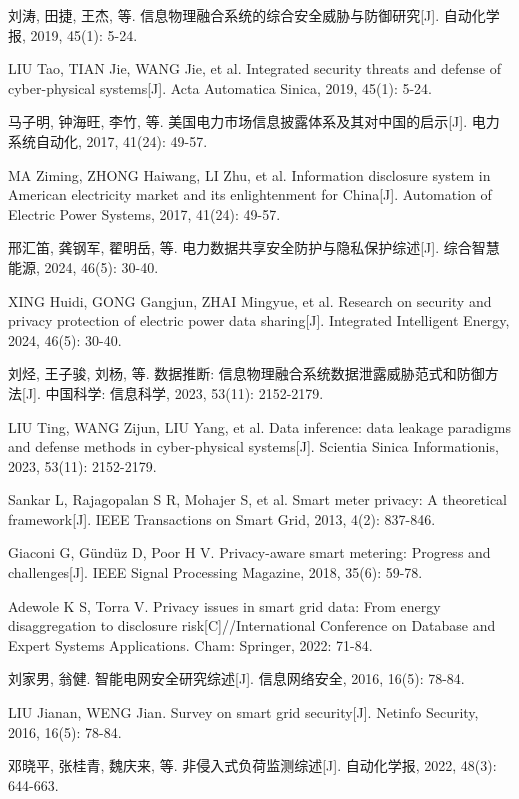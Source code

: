 刘涛, 田捷, 王杰, 等. 信息物理融合系统的综合安全威胁与防御研究[J]. 自动化学报, 2019, 45(1): 5-24.

LIU Tao, TIAN Jie, WANG Jie, et al. Integrated security threats and defense of cyber-physical systems[J]. Acta Automatica Sinica, 2019, 45(1): 5-24.

马子明, 钟海旺, 李竹, 等. 美国电力市场信息披露体系及其对中国的启示[J]. 电力系统自动化, 2017, 41(24): 49-57.

MA Ziming, ZHONG Haiwang, LI Zhu, et al. Information disclosure system in American electricity market and its enlightenment for China[J]. Automation of Electric Power Systems, 2017, 41(24): 49-57.

邢汇笛, 龚钢军, 翟明岳, 等. 电力数据共享安全防护与隐私保护综述[J]. 综合智慧能源, 2024, 46(5): 30-40.

XING Huidi, GONG Gangjun, ZHAI Mingyue, et al. Research on security and privacy protection of electric power data sharing[J]. Integrated Intelligent Energy, 2024, 46(5): 30-40.

刘烃, 王子骏, 刘杨, 等. 数据推断: 信息物理融合系统数据泄露威胁范式和防御方法[J]. 中国科学: 信息科学, 2023, 53(11): 2152-2179.

LIU Ting, WANG Zijun, LIU Yang, et al. Data inference: data leakage paradigms and defense methods in cyber-physical systems[J]. Scientia Sinica Informationis, 2023, 53(11): 2152-2179.

Sankar L, Rajagopalan S R, Mohajer S, et al. Smart meter privacy: A theoretical framework[J]. IEEE Transactions on Smart Grid, 2013, 4(2): 837-846.

Giaconi G, Gündüz D, Poor H V. Privacy-aware smart metering: Progress and challenges[J]. IEEE Signal Processing Magazine, 2018, 35(6): 59-78.

Adewole K S, Torra V. Privacy issues in smart grid data: From energy disaggregation to disclosure risk[C]//International Conference on Database and Expert Systems Applications. Cham: Springer, 2022: 71-84.

刘家男, 翁健. 智能电网安全研究综述[J]. 信息网络安全, 2016, 16(5): 78-84.

LIU Jianan, WENG Jian. Survey on smart grid security[J]. Netinfo Security, 2016, 16(5): 78-84.

邓晓平, 张桂青, 魏庆来, 等. 非侵入式负荷监测综述[J]. 自动化学报, 2022, 48(3): 644-663.

